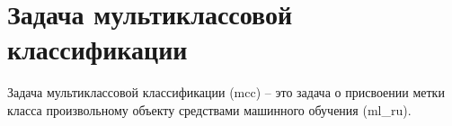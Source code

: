 
\chapter{Задача мультиклассовой классификации}
Задача мультиклассовой классификации (\acrshort{mcc}) -- это задача о присвоении метки класса произвольному объекту средствами машинного обучения (\acrshort{ml_ru}).

